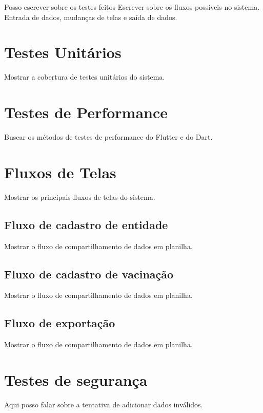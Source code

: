 
\label{Cap:ExperimentosResultados}

Posso escrever sobre os testes feitos
Escrever sobre os fluxos possíveis no sistema. Entrada de dados, mudanças de telas e saída de dados.

\section{Testes Unitários}
\label{cap5:Sec:TestesUnitarios}
Mostrar a cobertura de testes unitários do sistema.

\section{Testes de Performance}
\label{cap5:Sec:TestesPerformance}
Buscar os métodos de testes de performance do Flutter e do Dart.

\section{Fluxos de Telas}
\label{cap5:Sec:FluxosTelas}
Mostrar os principais fluxos de telas do sistema.

\subsection{Fluxo de cadastro de entidade}
\label{cap5:SubSec:FluxoCadastroEntidade}
Mostrar o fluxo de compartilhamento de dados em planilha.

\subsection{Fluxo de cadastro de vacinação}
\label{cap5:SubSec:FluxoCadastroVacinacao}
Mostrar o fluxo de compartilhamento de dados em planilha.

\subsection{Fluxo de exportação}
\label{cap5:SubSec:FluxoExportacao}
Mostrar o fluxo de compartilhamento de dados em planilha.

\section{Testes de segurança}
\label{cap5:Sec:TestesSeguranca}
Aqui posso falar sobre a tentativa de adicionar dados inválidos.





